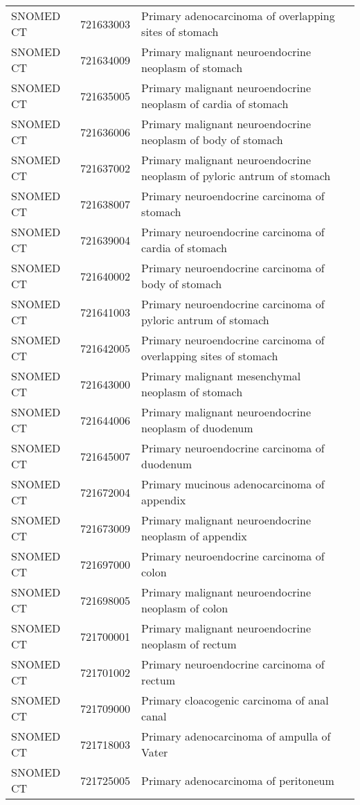 \begin{longtable}{p{}p{}p{}}
  SNOMED CT & 721633003 & Primary adenocarcinoma of overlapping sites of stomach \\ 
  SNOMED CT & 721634009 & Primary malignant neuroendocrine neoplasm of stomach \\ 
  SNOMED CT & 721635005 & Primary malignant neuroendocrine neoplasm of cardia of stomach \\ 
  SNOMED CT & 721636006 & Primary malignant neuroendocrine neoplasm of body of stomach \\ 
  SNOMED CT & 721637002 & Primary malignant neuroendocrine neoplasm of pyloric antrum of stomach \\ 
  SNOMED CT & 721638007 & Primary neuroendocrine carcinoma of stomach \\ 
  SNOMED CT & 721639004 & Primary neuroendocrine carcinoma of cardia of stomach \\ 
  SNOMED CT & 721640002 & Primary neuroendocrine carcinoma of body of stomach \\ 
  SNOMED CT & 721641003 & Primary neuroendocrine carcinoma of pyloric antrum of stomach \\ 
  SNOMED CT & 721642005 & Primary neuroendocrine carcinoma of overlapping sites of stomach \\ 
  SNOMED CT & 721643000 & Primary malignant mesenchymal neoplasm of stomach \\ 
  SNOMED CT & 721644006 & Primary malignant neuroendocrine neoplasm of duodenum \\ 
  SNOMED CT & 721645007 & Primary neuroendocrine carcinoma of duodenum \\ 
  SNOMED CT & 721672004 & Primary mucinous adenocarcinoma of appendix \\ 
  SNOMED CT & 721673009 & Primary malignant neuroendocrine neoplasm of appendix \\ 
  SNOMED CT & 721697000 & Primary neuroendocrine carcinoma of colon \\ 
  SNOMED CT & 721698005 & Primary malignant neuroendocrine neoplasm of colon \\ 
  SNOMED CT & 721700001 & Primary malignant neuroendocrine neoplasm of rectum \\ 
  SNOMED CT & 721701002 & Primary neuroendocrine carcinoma of rectum \\ 
  SNOMED CT & 721709000 & Primary cloacogenic carcinoma of anal canal \\ 
  SNOMED CT & 721718003 & Primary adenocarcinoma of ampulla of Vater \\ 
  SNOMED CT & 721725005 & Primary adenocarcinoma of peritoneum \\ 

\end{longtable}
